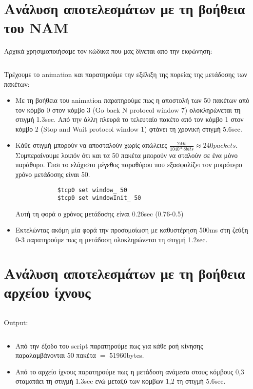 \documentclass[a4paper,9pt]{article}
\begin{document}
\def\thesection {\Roman{section}.}



\section*{Ανάλυση αποτελεσμάτων με τη βοήθεια του NAM}
Αρχικά χρησιμοποιήσαμε τον κώδικα που μας δίνεται από την εκφώνηση:

\inputminted[fontsize=\footnotesize]{tcl}{files/ex4_1.tcl}

Τρέχουμε το animation και παρατηρούμε την εξέλιξη της πορείας της μετάδοσης των
πακέτων:
\begin{itemize}
    \item Με τη βοήθεια του animation παρατηρούμε πως η αποστολή των 50
        πακέτων από τον κόμβο 0 στον κόμβο 3 (Go back N protocol window 7) ολοκληρώνεται τη
        στιγμή 1.3sec. Από την άλλη πλευρά το τελευταίο πακέτο από τον κόμβο 1
        στον κόμβο 2 (Stop and Wait protocol window 1) φτάνει τη χρονική
        στιγμή
        5.6sec.
    \item Κάθε στιγμή μπορούν να αποσταλούν χωρίς απώλειες
        $\frac{2Mb}{1040*8bits}\approx240packets$.  Συμπεραίνουμε λοιπόν ότι και
        τα 50 πακέτα μπορούν να σταλούν σε ένα μόνο παράθυρο. Έτσι το ελάχιστο μέγεθος παραθύρου που εξασφαλίζει τον
        μικρότερο χρόνο μετάδοσης είναι 50.
        \begin{verbatim}
            $tcp0 set window_ 50
            $tcp0 set windowInit_ 50
        \end{verbatim}
        Αυτή τη φορά ο χρόνος μετάδοσης είναι 0.26sec (0.76-0.5)
    \item Εκτελώντας ακόμη μία φορά την προσομοίωση με καθυστέρηση 500ms στη
        ζεύξη 0-3 παρατηρούμε πως η μετάδοση ολοκληρώνεται τη στιγμή 1.2sec.
\end{itemize}

\section*{Ανάλυση αποτελεσμάτων με τη βοήθεια αρχείου ίχνους}
\inputminted[fontsize=\footnotesize]{awk}{files/script_1.awk}

\noindent Output:
\inputminted[fontsize=\footnotesize]{text}{files/awk.out}

\begin{itemize}
    \item Από την έξοδο του script παρατηρούμε πως για κάθε ροή κίνησης
        παραλαμβάνονται 50 πακέτα $=$ 51960bytes. 
    \item Από το αρχείο ίχνους παρατηρούμε πως η μετάδοση ανάμεσα στους
        κόμβους 0,3 σταματάει τη στιγμή 1.3sec ενώ μεταξύ των κόμβων 1,2 τη
        στιγμή 5.6sec.
\end{itemize}
\end{document}
